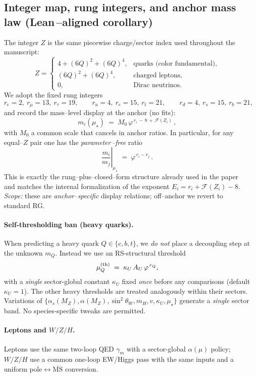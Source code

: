 \documentclass[epjc3]{svjour3}
\begin{document}
\subsection*{Integer map, rung integers, and anchor mass law (Lean\,–aligned corollary)}
The integer $Z$ is the same piecewise charge/sector index used throughout the manuscript:
\[
Z=\begin{cases}
4+(6Q)^2+(6Q)^4,& \text{quarks (color fundamental)},\\[2pt]
(6Q)^2+(6Q)^4,& \text{charged leptons},\\[2pt]
0,& \text{Dirac neutrinos}.
\end{cases}
\]
We adopt the fixed rung integers
\[
 r_e=2,\ r_\mu=13,\ r_\tau=19,\qquad
 r_u=4,\ r_c=15,\ r_t=21,\qquad
 r_d=4,\ r_s=15,\ r_b=21,
\]
and record the mass–level display at the anchor (no fits):
\[
\boxed{\ \ m_i(\mu_\star)\;=\;M_0\,\varphi^{\,r_i\,-\,8\,+\,\mathcal F(Z_i)}\,,\ \ }
\]
with $M_0$ a common scale that cancels in anchor ratios. In particular, for any equal–$Z$ pair one has the \emph{parameter\,–free} ratio
\[
\left.\frac{m_i}{m_j}\right|_{\mu_\star} \;=\; \varphi^{\,r_i-r_j}\,.
\]
This is exactly the rung–plus–closed–form structure already used in the paper and matches the internal formalization of the exponent $E_i=r_i+\mathcal F(Z_i)-8$. \emph{Scope:} these are \emph{anchor–specific} display relations; off–anchor we revert to standard RG. %


\paragraph{Self-thresholding ban (heavy quarks).}
When predicting a heavy quark $Q\in\{c,b,t\}$, we \emph{do not} place a decoupling step at the unknown $m_Q$. Instead we use an RS-structural threshold
\[
\mu_Q^{\rm(th)} \;=\; \kappa_U\,A_U\,\varphi^{\,r_Q},
\]
with a \emph{single} sector-global constant $\kappa_U$ fixed \emph{once} before any comparisons (default $\kappa_U=1$). The other heavy thresholds are treated analogously within their sectors. Variations of $\{\alpha_s(M_Z),\alpha(M_Z),\sin^2\theta_W,m_H,v,\kappa_U,\mu_\star\}$ generate a \emph{single} sector band. No species-specific tweaks are permitted.

\paragraph{Leptons and $W/Z/H$.}
Leptons use the same two-loop QED $\gamma_m$ with a sector-global $\alpha(\mu)$ policy; $W/Z/H$ use a common one-loop EW/Higgs pass with the same inputs and a uniform pole$\leftrightarrow\overline{\mathrm{MS}}$ conversion.
\end{document}
